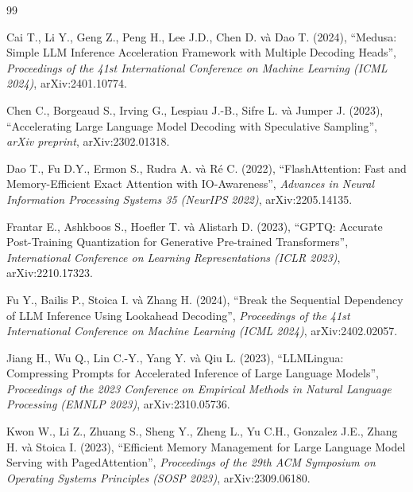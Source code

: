 \begin{thebibliography}{99}
\setlength{\itemsep}{4pt}

Cai T., Li Y., Geng Z., Peng H., Lee J.D., Chen D. và Dao T. (2024),
``Medusa: Simple LLM Inference Acceleration Framework with Multiple Decoding Heads'',
\textit{Proceedings of the 41st International Conference on Machine Learning (ICML 2024)},
arXiv:2401.10774.

Chen C., Borgeaud S., Irving G., Lespiau J.-B., Sifre L. và Jumper J. (2023),
``Accelerating Large Language Model Decoding with Speculative Sampling'',
\textit{arXiv preprint}, arXiv:2302.01318.

Dao T., Fu D.Y., Ermon S., Rudra A. và Ré C. (2022),
``FlashAttention: Fast and Memory-Efficient Exact Attention with IO-Awareness'',
\textit{Advances in Neural Information Processing Systems 35 (NeurIPS 2022)},
arXiv:2205.14135.

Frantar E., Ashkboos S., Hoefler T. và Alistarh D. (2023),
``GPTQ: Accurate Post-Training Quantization for Generative Pre-trained Transformers'',
\textit{International Conference on Learning Representations (ICLR 2023)},
arXiv:2210.17323.

Fu Y., Bailis P., Stoica I. và Zhang H. (2024),
``Break the Sequential Dependency of LLM Inference Using Lookahead Decoding'',
\textit{Proceedings of the 41st International Conference on Machine Learning (ICML 2024)},
arXiv:2402.02057.

Jiang H., Wu Q., Lin C.-Y., Yang Y. và Qiu L. (2023),
``LLMLingua: Compressing Prompts for Accelerated Inference of Large Language Models'',
\textit{Proceedings of the 2023 Conference on Empirical Methods in Natural Language
Processing (EMNLP 2023)}, arXiv:2310.05736.

Kwon W., Li Z., Zhuang S., Sheng Y., Zheng L., Yu C.H., Gonzalez J.E., Zhang H. và Stoica I. (2023),
``Efficient Memory Management for Large Language Model Serving with PagedAttention'',
\textit{Proceedings of the 29th ACM Symposium on Operating Systems Principles (SOSP 2023)},
arXiv:2309.06180.


\end{thebibliography}

